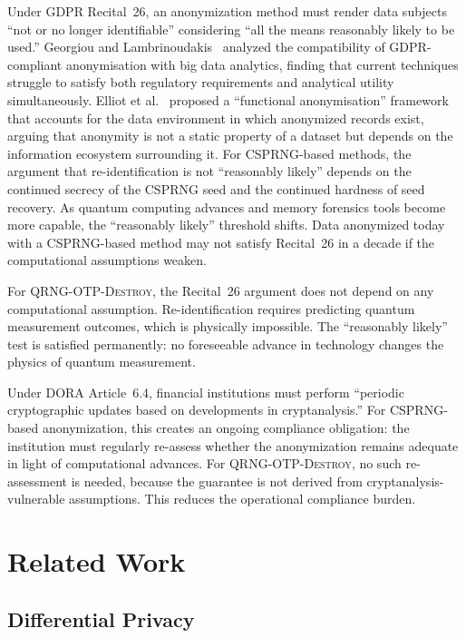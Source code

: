 \documentclass[journal]{IEEEtran}
\begin{document}
Under GDPR Recital~26, an anonymization method must render data subjects ``not or no longer identifiable'' considering ``all the means reasonably likely to be used.'' Georgiou and Lambrinoudakis~\cite{georgiou2020gdpr} analyzed the compatibility of GDPR-compliant anonymisation with big data analytics, finding that current techniques struggle to satisfy both regulatory requirements and analytical utility simultaneously. Elliot et al.~\cite{elliot2018functional} proposed a ``functional anonymisation'' framework that accounts for the data environment in which anonymized records exist, arguing that anonymity is not a static property of a dataset but depends on the information ecosystem surrounding it. For CSPRNG-based methods, the argument that re-identification is not ``reasonably likely'' depends on the continued secrecy of the CSPRNG seed and the continued hardness of seed recovery. As quantum computing advances and memory forensics tools become more capable, the ``reasonably likely'' threshold shifts. Data anonymized today with a CSPRNG-based method may not satisfy Recital~26 in a decade if the computational assumptions weaken.

For \textsc{QRNG-OTP-Destroy}, the Recital~26 argument does not depend on any computational assumption. Re-identification requires predicting quantum measurement outcomes, which is physically impossible. The ``reasonably likely'' test is satisfied permanently: no foreseeable advance in technology changes the physics of quantum measurement.

Under DORA Article~6.4, financial institutions must perform ``periodic cryptographic updates based on developments in cryptanalysis.'' For CSPRNG-based anonymization, this creates an ongoing compliance obligation: the institution must regularly re-assess whether the anonymization remains adequate in light of computational advances. For \textsc{QRNG-OTP-Destroy}, no such re-assessment is needed, because the guarantee is not derived from cryptanalysis-vulnerable assumptions. This reduces the operational compliance burden.

\section{Related Work}
\label{sec:related}

\subsection{Differential Privacy}
\label{subsec:dp}
\end{document}
